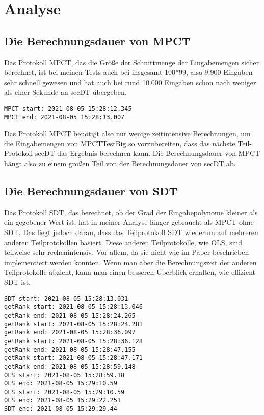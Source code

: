 
\chapter{Analyse}


\section{Die Berechnungsdauer von MPCT}
Das Protokoll MPCT, das die Größe der Schnittmenge der Eingabemengen sicher berechnet, ist bei meinen Tests auch bei insgesamt 100*99, also 9.900 Eingaben sehr schnell gewesen und hat auch bei rund 10.000 Eingaben schon nach weniger als einer Sekunde an secDT übergeben.\\
\begin{lstlisting}[caption = Ausschnitt von Rückgabe von Test MPCTTestBig. Dauer von MPCT ohne SDT]
MPCT start: 2021-08-05 15:28:12.345
MPCT end: 2021-08-05 15:28:13.007
\end{lstlisting}
Das Protokoll MPCT benötigt also nur wenige zeitintensive Berechnungen, um die Eingabemengen von MPCTTestBig so vorzubereiten, dass das nächste Teil-Protokoll secDT das Ergebnis berechnen kann. Die Berechnungsdauer von MPCT hängt also zu einem großen Teil von der Berechnungsdauer von secDT ab.

\section{Die Berechnungsdauer von SDT}
Das Protokoll SDT, das berechnet, ob der Grad der Eingabepolynome kleiner als ein gegebener Wert ist, hat in meiner Analyse länger gebraucht als MPCT ohne SDT. Das liegt jedoch daran, dass das Teilprotokoll SDT wiederum auf mehreren anderen Teilprotokollen basiert. Diese anderen Teilprotokolle, wie OLS, sind teilweise sehr rechenintensiv. Vor allem, da sie nicht wie im Paper beschrieben implementiert werden konnten. Wenn man aber die Berechnungszeit der anderen Teilprotokolle abzieht, kann man einen besseren Überblick erhalten, wie effizient SDT ist.

\begin{lstlisting}[caption = Ausschnitt von Rückgabe von Test MPCTTestBig. Dauer von SDT]
SDT start: 2021-08-05 15:28:13.031
getRank start: 2021-08-05 15:28:13.046
getRank end: 2021-08-05 15:28:24.265
getRank start: 2021-08-05 15:28:24.281
getRank end: 2021-08-05 15:28:36.097
getRank start: 2021-08-05 15:28:36.128
getRank end: 2021-08-05 15:28:47.155
getRank start: 2021-08-05 15:28:47.171
getRank end: 2021-08-05 15:28:59.148
OLS start: 2021-08-05 15:28:59.18
OLS end: 2021-08-05 15:29:10.59
OLS start: 2021-08-05 15:29:10.59
OLS end: 2021-08-05 15:29:22.251
SDT end: 2021-08-05 15:29:29.44

\end{lstlisting}

